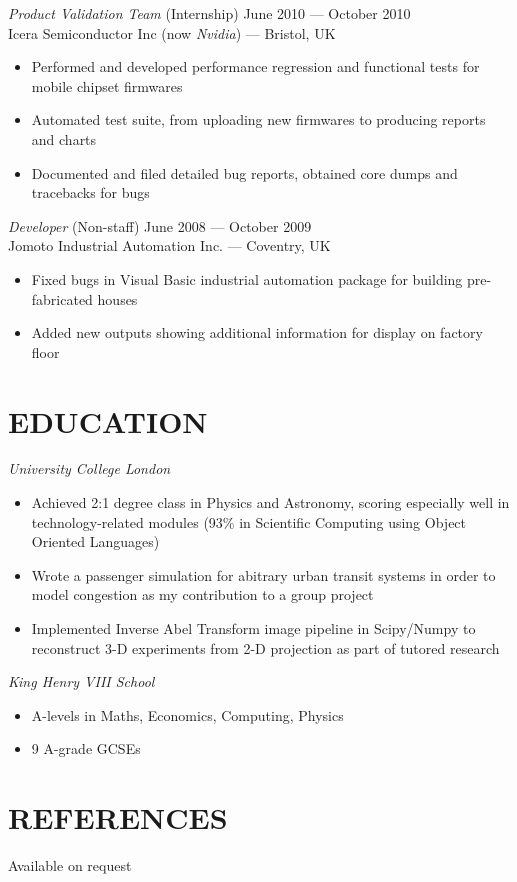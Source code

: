 \documentclass[margin, 10pt]{res} %
\begin{document}
\begin{resume}
{\sl Product Validation Team} \hfill (Internship) June 2010 --- October 2010 \\
Icera Semiconductor Inc (now \textit{Nvidia}) --- Bristol, UK \\
\begin{itemize}
\item Performed and developed performance regression and functional tests for mobile chipset firmwares
\item Automated test suite, from uploading new firmwares to producing reports and charts
\item Documented and filed detailed bug reports, obtained core dumps and tracebacks for bugs
\end{itemize}
{\sl Developer} \hfill (Non-staff) June 2008 --- October 2009 \\
Jomoto Industrial Automation Inc. --- Coventry, UK \\
\begin{itemize}
\item Fixed bugs in Visual Basic industrial automation package for building pre-fabricated houses
\item Added new outputs showing additional information for display on factory floor
\end{itemize}


\section{EDUCATION}

{\sl University College London} \\
\begin{itemize} \itemsep -2pt %
\item Achieved 2:1 degree class in Physics and Astronomy, scoring especially well in technology-related modules (93\% in Scientific Computing using Object Oriented Languages)
\item Wrote a passenger simulation for abitrary urban transit systems in order to model congestion as my contribution to a group project
\item Implemented Inverse Abel Transform image pipeline in Scipy/Numpy to reconstruct 3-D experiments from 2-D projection as part of tutored research
\end{itemize}

{\sl King Henry VIII School} \\
\begin{itemize}
\item A-levels in Maths, Economics, Computing, Physics
\item 9 A-grade GCSEs
\end{itemize}

\section{REFERENCES}
Available on request

\end{resume}
\end{document}
